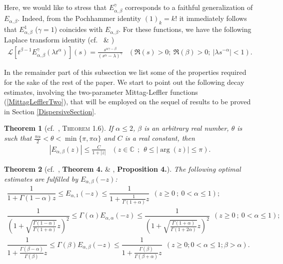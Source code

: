 \documentclass{amsart}
\newtheorem{theorem}{Theorem}[section]
\theoremstyle{definition}
\theoremstyle{remark}
\numberwithin{equation}{section}
\begin{document}
Here, we would like to stress that $E_{\alpha,\beta}^\gamma$ corresponds to a faithful generalization of $E_{\alpha,\beta}$. Indeed, from the Pochhammer identity $(1)_k=k!$ it immediately follows that $E_{\alpha,\beta}^1$ ($\gamma=1$) coincides with $E_{\alpha,\beta}$.
For these functions, we have the following Laplace transform identity (cf.~\cite[eq. (5.1.26) of p. 102]{GKMaiR14} \& \cite[eq.~(1.9.13) of p.~47]{KST06})
\begin{eqnarray}
	\label{LaplaceIdentityMittagLeffler}
	\mathcal{L}[t^{\beta-1}E_{\alpha,\beta}^\gamma(\lambda t^\alpha)](s)=\frac{s^{\alpha \gamma-\beta}}{(s^\alpha-\lambda)^\gamma} & (\Re(s)>0;~\Re(\beta)>0;~|\lambda s^{-\alpha}|<1).
\end{eqnarray}

In the remainder part of this subsection we list some of the properties required for the sake of the rest of the paper. 
We start to point out the following decay estimates, involving the two-parameter Mittag-Leffler functions (\ref{MittagLefflerTwo}), that will be employed on the sequel of results to be proved in Section \ref{DispersiveSection}.
\begin{theorem}[cf.~\cite{Podlubny99}, \textsc{Theorem 1.6}]\label{EstimatesMittagLeffler}
	If $\alpha\leq 2$, $\beta$ is an arbitrary real number, $\theta$ is such that $\frac{\pi\alpha}{2}<\theta<\min\{\pi,\pi\alpha\}$ and $C$ is a real constant, then
	\begin{eqnarray*}
		|E_{\alpha,\beta}(z)|\leq \frac{C}{1+|z|} &(z \in\mathbb{C}~~;~~\theta\leq |\arg(z)|\leq \pi).
	\end{eqnarray*} 
\end{theorem}

\begin{theorem}[cf.~\cite{Simon14}, {\bf Theorem 4.} \& \cite{BS21}, {\bf Proposition 4.}]\label{OptimalEstimatesMittagLeffler}
	The following optimal estimates are fulfilled by $E_{\alpha,\beta}(-z)$:
	\begin{eqnarray*}
		\dfrac{1}{1+\Gamma(1-\alpha)z} \leq E_{\alpha,1}(-z)\leq \dfrac{1}{1+\frac{1}{\Gamma(1+\alpha)}z} ~~ (z\geq0~;~0< \alpha\leq 1);\\
		\dfrac{1}{\left(1+\sqrt{\frac{\Gamma(1-\alpha)}{\Gamma(1+\alpha)}}z\right)^2}\leq \Gamma(\alpha) E_{\alpha,\alpha}(-z)\leq \dfrac{1}{\left(1+\sqrt{\frac{\Gamma(1+\alpha)}{\Gamma(1+2\alpha)}}z\right)^2} ~~ (z\geq0~;~0< \alpha\leq 1); \\
		\dfrac{1}{1+\frac{\Gamma(\beta-\alpha)}{\Gamma(\beta)}z} \leq \Gamma(\beta)E_{\alpha,\beta}(-z)\leq \dfrac{1}{1+\frac{\Gamma(\beta)}{\Gamma(\beta+\alpha)}z} ~~ (z\geq0;0<\alpha\leq 1;\beta>\alpha).
	\end{eqnarray*}
\end{theorem}
\end{document}
